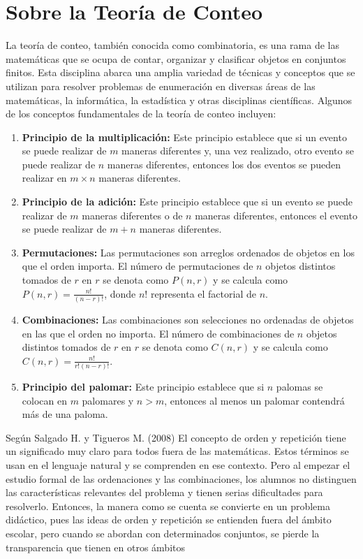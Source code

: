 \documentclass[11pt, a4paper]{article}
\begin{document}
\section{Sobre la Teoría de Conteo}
  La teoría de conteo, también conocida como combinatoria, es una rama de las matemáticas que se ocupa de contar, organizar y clasificar objetos en conjuntos finitos. Esta disciplina abarca una amplia variedad de técnicas y conceptos que se utilizan para resolver problemas de enumeración en diversas áreas de las matemáticas, la informática, la estadística y otras disciplinas científicas. Algunos de los conceptos fundamentales de la teoría de conteo incluyen:
  \begin{enumerate}[label=2.\arabic*] %
    \item \textbf{Principio de la multiplicación:} Este principio establece que si un evento se puede realizar de \( m \) maneras diferentes y, una vez realizado, otro evento se puede realizar de \( n \) maneras diferentes, entonces los dos eventos se pueden realizar en \( m \times n \) maneras diferentes.
    \item \textbf{Principio de la adición:} Este principio establece que si un evento se puede realizar de \( m \) maneras diferentes o de \( n \) maneras diferentes, entonces el evento se puede realizar de \( m + n \) maneras diferentes.
    \item \textbf{Permutaciones:} Las permutaciones son arreglos ordenados de objetos en los que el orden importa. El número de permutaciones de \( n \) objetos distintos tomados de \( r \) en \( r \) se denota como \( P(n, r) \) y se calcula como \( P(n, r) = \frac{n!}{(n - r)!} \), donde \( n! \) representa el factorial de \( n \).
    \item \textbf{Combinaciones:} Las combinaciones son selecciones no ordenadas de objetos en las que el orden no importa. El número de combinaciones de \( n \) objetos distintos tomados de \( r \) en \( r \) se denota como \( C(n, r) \) y se calcula como \( C(n, r) = \frac{n!}{r!(n - r)!} \).
    \item \textbf{Principio del palomar:} Este principio establece que si \( n \) palomas se colocan en \( m \) palomares y \( n > m \), entonces al menos un palomar contendrá más de una paloma.
  \end{enumerate}
  
  Según Salgado H. y Tigueros M. (2008) El concepto de orden y repetición tiene un significado muy claro para todos fuera de las matemáticas. Estos términos se usan en el lenguaje natural y se comprenden en ese contexto. Pero al empezar el estudio formal de las ordenaciones y las combinaciones, los alumnos no distinguen las características relevantes del problema y tienen serias dificultades para resolverlo. Entonces, la manera como se cuenta se convierte en un problema didáctico, pues las ideas de orden y repetición se entienden fuera del ámbito escolar, pero cuando se abordan con determinados conjuntos, se pierde la transparencia que tienen en otros ámbitos
\end{document}
